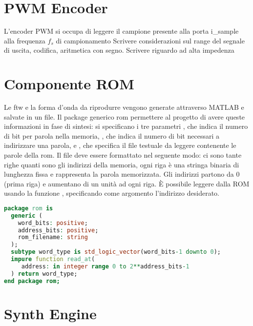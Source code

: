 \section{PWM Encoder}
\label{sec:pwmencoder}

\begin{center}
\end{center}
L'encoder PWM si occupa di leggere il campione presente alla porta i\_sample alla frequenza $f_s$ di campionamento
Scrivere considerazioni sul range del segnale di uscita, codifica, aritmetica con segno.
Scrivere riguardo ad alta impedenza

\section{Componente ROM}
\label{sec:rom}
Le ftw e la forma d'onda da riprodurre vengono generate attraverso MATLAB e salvate in un file.
Il package generico rom permettere al progetto di avere queste informazioni in fase di sintesi: si specificano i tre parametri , che indica il numero di bit per parola nella memoria, , che indica il numero di bit necessari a indirizzare una parola, e , che specifica il file testuale da leggere contenente le parole della rom.
Il file deve essere formattato nel seguente modo: ci sono tante righe quanti sono gli indirizzi della memoria, ogni riga è una stringa binaria
di lunghezza fissa e rappresenta la parola memorizzata.
Gli indirizzi partono da 0 (prima riga) e aumentano di un unità ad ogni riga.
È possibile leggere dalla ROM usando la funzione , specificando come argomento l'indirizzo desiderato.
\begin{lstlisting}[language=VHDL]
package rom is
  generic (
    word_bits: positive;
    address_bits: positive;
    rom_filename: string
  );
  subtype word_type is std_logic_vector(word_bits-1 downto 0);
  impure function read_at(
     address: in integer range 0 to 2**address_bits-1
  ) return word_type;
end package rom;
\end{lstlisting}

\section{Synth Engine}
\label{sec:synthengine}

\begin{center}
\end{center}

